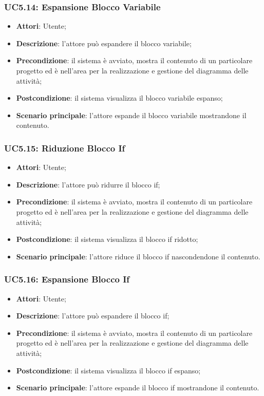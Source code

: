\subsubsection{UC5.14: Espansione Blocco Variabile}
\label{UC5.14}
\begin{itemize}
	\item \textbf{Attori}: Utente;
	\item \textbf{Descrizione}: l'attore può espandere il blocco variabile;
	\item \textbf{Precondizione}: il sistema è avviato, mostra il contenuto di un particolare progetto ed è nell'area per la realizzazione e gestione del diagramma delle attività;
	\item \textbf{Postcondizione}: il sistema visualizza il blocco variabile espanso;
	\item \textbf{Scenario principale}: l'attore espande il blocco variabile mostrandone il contenuto.
\end{itemize}

\subsubsection{UC5.15: Riduzione Blocco If}
\label{UC5.15}
\begin{itemize}
	\item \textbf{Attori}: Utente;
	\item \textbf{Descrizione}: l'attore può ridurre il blocco if;
	\item \textbf{Precondizione}: il sistema è avviato, mostra il contenuto di un particolare progetto ed è nell'area per la realizzazione e gestione del diagramma delle attività;
	\item \textbf{Postcondizione}: il sistema visualizza il blocco if ridotto;
	\item \textbf{Scenario principale}: l'attore riduce il blocco if nascondendone il contenuto.
\end{itemize}

\subsubsection{UC5.16: Espansione Blocco If}
\label{UC5.16}
\begin{itemize}
	\item \textbf{Attori}: Utente;
	\item \textbf{Descrizione}: l'attore può espandere il blocco if;
	\item \textbf{Precondizione}: il sistema è avviato, mostra il contenuto di un particolare progetto ed è nell'area per la realizzazione e gestione del diagramma delle attività;
	\item \textbf{Postcondizione}: il sistema visualizza il blocco if espanso;
	\item \textbf{Scenario principale}: l'attore espande il blocco if mostrandone il contenuto.
\end{itemize}

